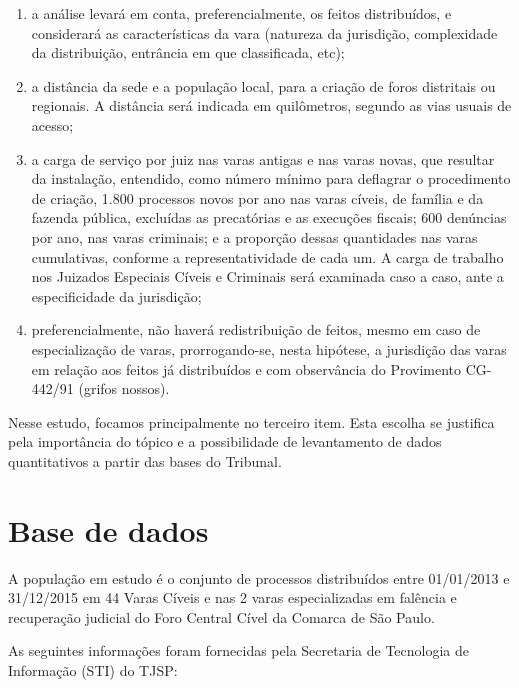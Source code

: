 \documentclass[]{book}
\providecommand{\tightlist}{%
  \setlength{\itemsep}{0pt}\setlength{\parskip}{0pt}}
\begin{document}
\begin{enumerate}
\def\labelenumi{\arabic{enumi}.}
\tightlist
\item
  a análise levará em conta, preferencialmente, os feitos distribuídos,
  e considerará as características da vara (natureza da jurisdição,
  complexidade da distribuição, entrância em que classificada, etc);
\item
  a distância da sede e a população local, para a criação de foros
  distritais ou regionais. A distância será indicada em quilômetros,
  segundo as vias usuais de acesso;
\item
  a carga de serviço por juiz nas varas antigas e nas varas novas, que
  resultar da instalação, entendido, como número mínimo para deflagrar o
  procedimento de criação, 1.800 processos novos por ano nas varas
  cíveis, de família e da fazenda pública, excluídas as precatórias e as
  execuções fiscais; 600 denúncias por ano, nas varas criminais; e a
  proporção dessas quantidades nas varas cumulativas, conforme a
  representatividade de cada um. A carga de trabalho nos Juizados
  Especiais Cíveis e Criminais será examinada caso a caso, ante a
  especificidade da jurisdição;
\item
  preferencialmente, não haverá redistribuição de feitos, mesmo em caso
  de especialização de varas, prorrogando-se, nesta hipótese, a
  jurisdição das varas em relação aos feitos já distribuídos e com
  observância do Provimento CG- 442/91 (grifos nossos).
\end{enumerate}

Nesse estudo, focamos principalmente no terceiro item. Esta escolha se
justifica pela importância do tópico e a possibilidade de levantamento
de dados quantitativos a partir das bases do Tribunal.

\section{Base de dados}\label{base-de-dados}

A população em estudo é o conjunto de processos distribuídos entre
01/01/2013 e 31/12/2015 em 44 Varas Cíveis e nas 2 varas especializadas
em falência e recuperação judicial do Foro Central Cível da Comarca de
São Paulo.

As seguintes informações foram fornecidas pela Secretaria de Tecnologia
de Informação (STI) do TJSP:
\end{document}
